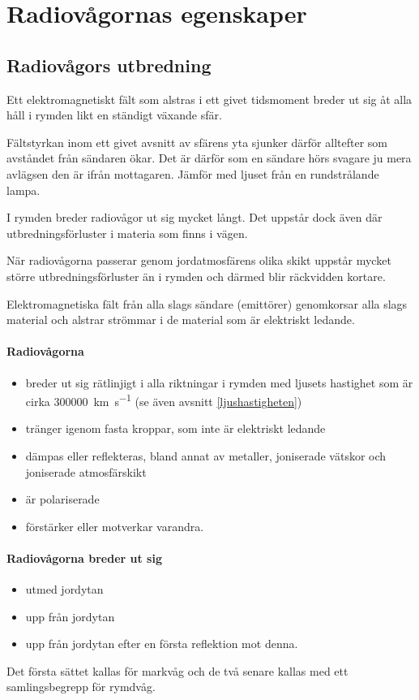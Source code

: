 \section{Radiovågornas egenskaper}
\label{radiovågornasegenskaper}

\subsection{Radiovågors utbredning}

Ett elektromagnetiskt fält som alstras i ett givet tidsmoment breder
ut sig åt alla håll i rymden likt en ständigt växande sfär.

Fältstyrkan inom ett givet avsnitt av sfärens yta sjunker därför alltefter som
avståndet från sändaren ökar.
Det är därför som en sändare hörs svagare ju mera avlägsen den är ifrån
mottagaren.
Jämför med ljuset från en rundstrålande lampa.

I rymden breder radiovågor ut sig mycket långt. Det uppstår dock även
där utbredningsförluster i materia som finns i vägen.

När radiovågorna passerar genom jordatmosfärens olika skikt uppstår mycket
större utbredningsförluster än i rymden och därmed blir räckvidden kortare.

Elektromagnetiska fält från alla slags sändare (emittörer) genomkorsar alla
slags material och alstrar strömmar i de material som är elektriskt ledande.

\paragraph{Radiovågorna}
\begin{itemize}
  \item breder ut sig rätlinjigt i alla riktningar i rymden med ljusets
  hastighet som är cirka \SI{300000}{\kilo\metre\per\second} (se även avsnitt
  \ref{ljushastigheten})
  \item tränger igenom fasta kroppar, som inte är elektriskt ledande
  \item dämpas eller reflekteras, bland annat av metaller, joniserade vätskor
  och joniserade atmosfärskikt
  \item är polariserade
  \item förstärker eller motverkar varandra.
\end{itemize}

\paragraph{Radiovågorna breder ut sig}
\begin{itemize}
  \item utmed jordytan
  \item upp från jordytan
  \item upp från jordytan efter en första reflektion mot denna.
\end{itemize}
Det första sättet kallas för markvåg och de två senare kallas med ett
samlingsbegrepp för rymdvåg.


